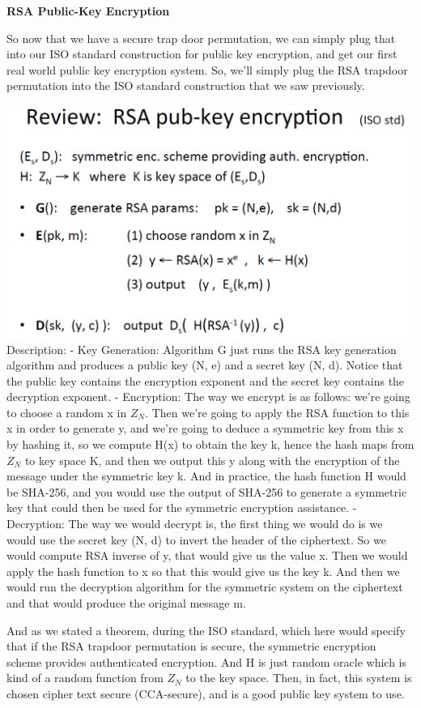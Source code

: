 \documentclass[11pt]{article}
\makeatletter
\def\maxwidth{\ifdim\Gin@nat@width>\linewidth\linewidth
    \else\Gin@nat@width\fi}
\let\Oldincludegraphics\includegraphics
\renewcommand{\includegraphics}[1]{\Oldincludegraphics[width=.8\maxwidth]{#1}}
\makeatother
\begin{document}
\textbf{RSA Public-Key Encryption}

So now that we have a secure trap door permutation, we can simply plug
that into our ISO standard construction for public key encryption, and
get our first real world public key encryption system. So, we'll simply
plug the RSA trapdoor permutation into the ISO standard construction
that we saw previously.

\includegraphics{./Images/RSA-PKEnc.png} Description: - Key Generation:
Algorithm G just runs the RSA key generation algorithm and produces a
public key (N, e) and a secret key (N, d). Notice that the public key
contains the encryption exponent and the secret key contains the
decryption exponent. - Encryption: The way we encrypt is as follows:
we're going to choose a random x in \(Z_{N}\). Then we're going to apply
the RSA function to this x in order to generate y, and we're going to
deduce a symmetric key from this x by hashing it, so we compute H(x) to
obtain the key k, hence the hash maps from \(Z_{N}\) to key space K, and
then we output this y along with the encryption of the message under the
symmetric key k. And in practice, the hash function H would be SHA-256,
and you would use the output of SHA-256 to generate a symmetric key that
could then be used for the symmetric encryption assistance. -
Decryption: The way we would decrypt is, the first thing we would do is
we would use the secret key (N, d) to invert the header of the
ciphertext. So we would compute RSA inverse of y, that would give us the
value x. Then we would apply the hash function to x so that this would
give us the key k. And then we would run the decryption algorithm for
the symmetric system on the ciphertext and that would produce the
original message m.

And as we stated a theorem, during the ISO standard, which here would
specify that if the RSA trapdoor permutation is secure, the symmetric
encryption scheme provides authenticated encryption. And H is just
random oracle which is kind of a random function from \(Z_{N}\) to the
key space. Then, in fact, this system is chosen cipher text secure
(CCA-secure), and is a good public key system to use.
\end{document}
